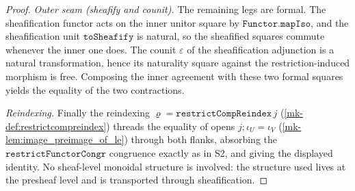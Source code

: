 \begin{proof}
  \emph{Outer seam (sheafify and counit).} The remaining legs are formal. The sheafification functor
  acts on the inner unitor square by \(\mathtt{Functor.mapIso}\), and the sheafification unit
  \(\mathtt{toSheafify}\) is natural, so the sheafified squares commute whenever the inner one does.
  The counit \(\varepsilon\) of the sheafification adjunction is a natural transformation, hence its
  naturality square against the restriction-induced morphism is free. Composing the inner agreement
  with these two formal squares yields the equality of the two contractions.

  \emph{Reindexing.} Finally the reindexing \(\varrho = \mathtt{restrictCompReindex}\,j\)
  (\ref{mk-def:restrictcompreindex}) threads the equality of opens
  \(j \mathbin{;} \iota_U = \iota_V\) (\ref{mk-lem:image_preimage_of_le}) through both flanks, absorbing
  the \(\mathtt{restrictFunctorCongr}\) congruence exactly as in S2, and giving the displayed
  identity. No sheaf-level monoidal structure is involved: the structure used lives at the presheaf
  level and is transported through sheafification.
\end{proof}

